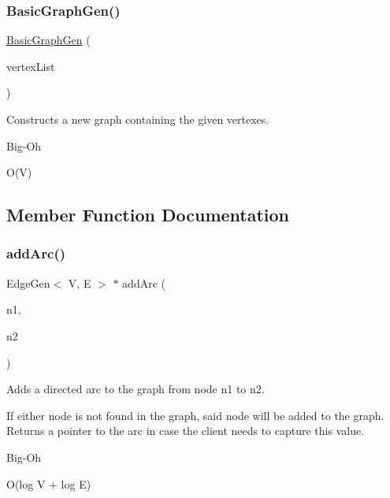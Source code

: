 \subsubsection{\texorpdfstring{Basic\+Graph\+Gen()}{BasicGraphGen()}\hspace{0.1cm}{\footnotesize\ttfamily [2/2]}}
{\footnotesize\ttfamily \mbox{\hyperlink{classBasicGraphGen}{Basic\+Graph\+Gen}} (\begin{DoxyParamCaption}\item[{std\+::initializer\+\_\+list$<$ std\+::string $>$}]{vertex\+List }\end{DoxyParamCaption})}



Constructs a new graph containing the given vertexes. 

\begin{DoxyRefDesc}{Big-\/\+Oh}
\item[\mbox{\hyperlink{BigOh__BigOh000002}{Big-\/\+Oh}}]O(\+V) \end{DoxyRefDesc}


\subsection{Member Function Documentation}
\mbox{\label{classGraph_aad2e9fedd7110ae2fb6873c5e2d29941}} 
\subsubsection{\texorpdfstring{add\+Arc()}{addArc()}\hspace{0.1cm}{\footnotesize\ttfamily [1/3]}}
{\footnotesize\ttfamily Edge\+Gen$<$ V, E $>$  $\ast$ add\+Arc (\begin{DoxyParamCaption}\item[{const std\+::string \&}]{n1,  }\item[{const std\+::string \&}]{n2 }\end{DoxyParamCaption})\hspace{0.3cm}{\ttfamily [inherited]}}



Adds a directed arc to the graph from node n1 to n2. 

If either node is not found in the graph, said node will be added to the graph. Returns a pointer to the arc in case the client needs to capture this value. \begin{DoxyRefDesc}{Big-\/\+Oh}
\item[\mbox{\hyperlink{BigOh__BigOh000042}{Big-\/\+Oh}}]O(log V + log E) \end{DoxyRefDesc}
\mbox{\label{classGraph_a7280d3cd76bab82df392ba91ed5257c6}} 
